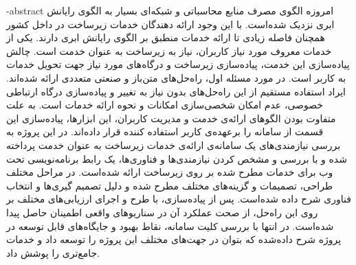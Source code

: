 
\department{}

\fa-abstract{
امروزه الگوی مصرف منابع محاسباتی و شبکه‌ای بسیار به الگوی رایانش ابری نزدیک شده‌است. با این وجود ارائه دهندگان خدمات زیرساخت در داخل کشور همچنان فاصله زیادی تا ارائه خدمات منطبق بر الگوی رایانش ابری دارند. یکی از خدمات معروف مورد نیاز کاربران، نیاز به زیرساخت به عنوان خدمت است. چالش پیاده‌سازی این خدمت، پیاده‌سازی زیرساخت و درگاه‌های مورد نیاز جهت تحویل خدمات به کاربر است. در مورد مسئله اول، راه‌حل‌های متن‌باز و صنعتی متعددی ارائه شده‌اند. ایراد استفاده مستقیم از این راه‌حل‌های بدون نیاز به تغییر و پیاده‌سازی درگاه ارتباطی خصوصی، عدم امکان شخصی‌سازی امکانات و نحوه ارائه خدمات است. به علت متفاوت بودن الگو‌های ارائه‌ی خدمت و مدیریت کاربران، این ابزار‌ها، پیاده‌سازی این قسمت از سامانه‌ را برعهده‌ی ‌کاربر استفاده کننده قرار داده‌اند. در این پروژه به بررسی نیازمندی‌های یک سامانه‌ی ارائه‌ی خدمات زیرساخت به عنوان خدمت پرداخته شده و با بررسی و مشخص کردن نیازمندی‌ها و فناوری‌ها، یک رابط برنامه‌نویسی تحت وب برای خدمات مطرح شده بر روی زیرساخت  ارائه شده‌است. در مراحل مختلف طراحی، تصمیمات و گزینه‌های مختلف مطرح شده و دلیل تصمیم گیری‌ها و انتخاب فناوری شرح داده شده‌است. پس از پیاده‌سازی، با طرح و اجرای ارزیابی‌های مختلف بر روی این راه‌حل، از صحت عملکرد آن در سناریو‌های واقعی اطمینان حاصل پیدا شده‌است. در انتها با بررسی کلیت سامانه، نقاط بهبود و جایگاه‌های قابل توسعه در پروژه شرح داده‌شده که بتوان در جهت‌های مختلف این پروژه را توسعه داد و خدمات جامع‌تری را پوشش داد.
}

